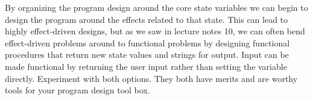 \documentclass[]{tufte-handout}
\begin{document}
By organizing the program design around the core state variables we can begin to design the program around the effects related to that state. This can lead to highly effect-driven designs, but as we saw in lecture notes 10, we can often bend effect-driven problems around to functional problems by designing functional procedures that return new state values and strings for output. Input can be made functional by returning the user input rather than setting the variable directly. Experiment with both options. They both have merits and are worthy tools for your program design tool box.
\end{document}

